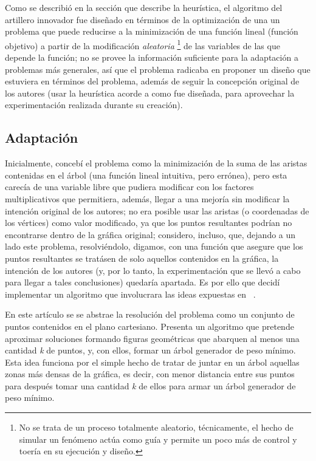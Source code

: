 \documentclass[a4paper]{report}
\begin{document}
  Como se describi\'o en la secci\'on que describe la heur\'istica, el algoritmo del artillero innovador
  fue dise\~nado en t\'erminos de la optimizaci\'on de una un problema que puede reducirse
  a la minimizaci\'on de una funci\'on lineal (funci\'on objetivo) a partir de la modificaci\'on
  \textit{aleatoria} \footnote{No se trata de un proceso totalmente aleatorio, t\'ecnicamente, el hecho de
    simular un fen\'omeno act\'ua como gu\'ia y permite un poco m\'as de control y toer\'ia en su
    ejecuci\'on y dise\~no.} de las variables de las que depende la funci\'on;
  no se provee la informaci\'on suficiente para la adaptaci\'on a problemas
  m\'as generales, as\'i que el problema radicaba en proponer un dise\~no que estuviera
  en t\'erminos del problema, adem\'as de seguir la concepci\'on original de los autores
  (usar la heur\'istica acorde a como fue dise\~nada, para aprovechar la experimentaci\'on
  realizada durante su creaci\'on).


  \subsection{Adaptaci\'on}
  Inicialmente, conceb\'i el problema como la minimizaci\'on de la suma de las aristas contenidas en el
  \'arbol (una funci\'on lineal intuitiva, pero err\'onea), pero esta carec\'ia de una variable
  libre que pudiera modificar con los factores multiplicativos que permitiera, adem\'as, llegar
  a una mejor\'ia sin modificar la intenci\'on original de los autores; no era posible usar las
  aristas (o coordenadas de los v\'ertices) como valor modificado, ya que los puntos resultantes
  podr\'ian no encontrarse dentro de la gr\'afica original; considero, incluso, que, dejando a
  un lado este problema, resolvi\'endolo, digamos, con una funci\'on que asegure que los puntos
  resultantes se trat\'asen de solo aquellos contenidos en la gr\'afica, la intenci\'on de los
  autores (y, por lo tanto, la experimentaci\'on que se llev\'o a cabo para llegar a tales
  conclusiones) quedar\'ia apartada. Es por ello que decid\'i implementar un algoritmo que
  involucrara las ideas expuestas en ~\cite{ravi}.

  En este art\'iculo se se abstrae la resoluci\'on del problema como un conjunto de puntos contenidos en el
  plano cartesiano. Presenta un algoritmo que pretende aproximar soluciones formando figuras geom\'etricas
  que abarquen al menos una cantidad \textit{k} de puntos, y, con ellos, formar un \'arbol generador
  de peso m\'inimo. Esta idea funciona por el simple hecho de tratar de juntar en un \'arbol aquellas zonas
  m\'as densas de la gr\'afica, es decir, con menor distancia entre sus puntos para despu\'es tomar
  una cantidad \textit{k} de ellos para armar un \'arbol generador de peso m\'inimo.
\end{document}
